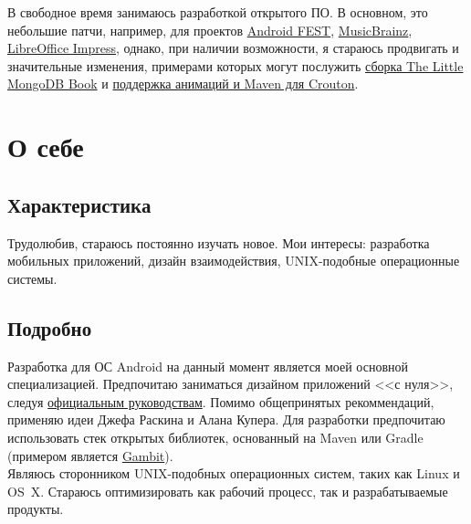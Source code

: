       В свободное время занимаюсь разработкой открытого ПО.
      В основном, это небольшие патчи, например, для проектов
      \href{https://github.com/square/fest-android/commits?author=ming13}{Android FEST},
      \href{https://github.com/jdamcd/musicbrainz-android/commits?author=ming13}{MusicBrainz},
      \href{https://gerrit.libreoffice.org/#/q/owner:%22Artur+Dryomov%22+status:closed,n,z}{LibreOffice Impress},
      однако, при наличии возможности, я стараюсь продвигать и значительные изменения, примерами
      которых могут послужить
      \href{https://github.com/karlseguin/the-little-mongodb-book/pull/16}{сборка The Little MongoDB Book} и
      \href{https://github.com/keyboardsurfer/Crouton/pulls/ming13?state=closed}{поддержка анимаций и Maven для Crouton}.


  \section*{О себе}

    \subsection*{Характеристика}

      Трудолюбив, стараюсь постоянно изучать новое.
      Мои интересы: разработка мобильных приложений, дизайн
      взаимодействия, UNIX-подобные операционные системы.

    \subsection*{Подробно}

      Разработка для ОС Android на данный момент является моей основной специализацией.
      Предпочитаю заниматься дизайном приложений <<с нуля>>, следуя
      \href{https://developer.android.com/design/}{официальным руководствам}.
      Помимо общепринятых рекоммендаций, применяю идеи Джефа Раскина
      и Алана Купера. Для разработки предпочитаю использовать стек
      открытых библиотек, основанный на Maven или Gradle (примером является
      \href{https://github.com/ming13/gambit}{Gambit}). \\

      Являюсь сторонником UNIX-подобных операционных систем,
      таких как Linux и OS~X. Стараюсь оптимизировать как рабочий процесс,
      так и разрабатываемые продукты. \\

  \vfill


